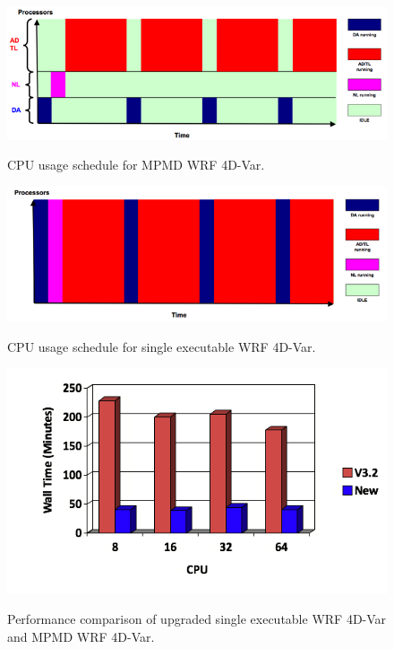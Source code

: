 \documentclass[12pt]{article}
\begin{document}
\begin{figure}[t]
  \noindent\includegraphics[width=40pc,angle=0]{mpmd_wrf4dvar.png}\\
  \caption{CPU usage schedule for MPMD WRF 4D-Var.}\label{mpmd_cpu}
\end{figure}
\begin{figure}[t]
  \noindent\includegraphics[width=40pc,angle=0]{single_exe_wrf4dvar.png}\\
  \caption{CPU usage schedule for single executable WRF 4D-Var.}\label{single_cpu}
\end{figure}
\begin{figure}[t]
  \noindent\includegraphics[width=40pc,angle=0]{big_case_performance.png}\\
  \caption{Performance comparison of upgraded single executable WRF 4D-Var and MPMD WRF 4D-Var.}\label{performance}
\end{figure}
\end{document}
